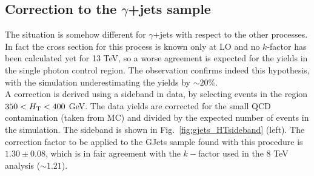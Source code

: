 \subsection{Correction to the $\gamma$+jets sample}
\label{sec:sideband_corrections_gjets}
The situation is somehow different for $\gamma$+jets with respect to the other processes. 
In fact the cross section for this process is known only at LO and no $k$-factor has been calculated yet for 13 TeV, 
so a worse agreement is expected for the yields in the single photon control region.
The observation confirms indeed this hypothesis, with the simulation underestimating the yields by $\sim 20\%$. \\
A correction is derived using a sideband in data, by selecting events in the region $350 < \scalht < 400$ GeV. 
The data yields are corrected for the small QCD contamination (taken from MC) and divided by the expected number of events in the simulation. 
The sideband is shown in Fig.~\ref{fig:gjets_HTsideband} (left).
The correction factor to be applied to the GJets sample found with this procedure is $1.30 \pm 0.08$, 
which is in fair agreement with the $k-$factor used in the 8 TeV analysis ($\sim 1.21$). 


